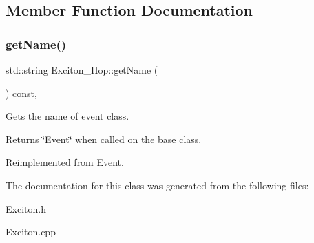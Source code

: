 \subsection{Member Function Documentation}
\mbox{\label{class_exciton___hop_a8e08c3992b06fa0efe7db438a381445b}} 
\subsubsection{\texorpdfstring{get\+Name()}{getName()}}
{\footnotesize\ttfamily std\+::string Exciton\+\_\+\+Hop\+::get\+Name (\begin{DoxyParamCaption}{ }\end{DoxyParamCaption}) const\hspace{0.3cm}{\ttfamily [inline]}, {\ttfamily [virtual]}}



Gets the name of event class. 

\begin{DoxyReturn}{Returns}
\char`\"{}\+Event\char`\"{} when called on the base class. 
\end{DoxyReturn}


Reimplemented from \hyperlink{class_event_a8c38a406d844d05eac1ef007bad2487f}{Event}.



The documentation for this class was generated from the following files\+:\begin{DoxyCompactItemize}
\item 
Exciton.\+h\item 
Exciton.\+cpp\end{DoxyCompactItemize}
